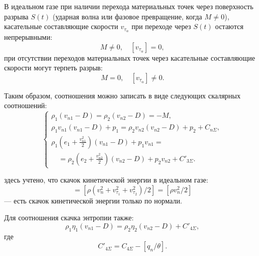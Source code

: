
\begin{theorem}
	В идеальном газе при наличии перехода материальных точек через поверхность разрыва $S(t)$ (ударная волна или фазовое превращение, когда $M \not = 0$), касательные составляющие скорости $v_{\tau_\alpha}$ при переходе через $S(t)$ остаются непрерывными:
	\begin{equation*}
		M \not = 0, \quad [v_{\tau_\alpha}] = 0,
	\end{equation*}
	при отсутствии переходов материальных точек через касательные составляющие скорости могут терпеть разрыв:
	\begin{equation*}
		M = 0, \quad [v_{\tau_\alpha}] \not = 0.
	\end{equation*}
\end{theorem}

Таким образом, соотношения можно записать в виде следующих скалярных соотношений:
\begin{equation}
	\begin{cases}
		\rho_1 \left(v_{n1} - D\right) = \rho_2 \left(v_{n2} - D\right) = -M, \\
		\rho_1 v_{n1} \left(v_{n1} - D\right) + p_1 = \rho_2 v_{n2} \left(v_{n2} - D\right) + p_2 + C_{n\Sigma}, \\
		\rho_1 \left(e_1 + \frac{v_{n1}^2}{2}\right) \left(v_{n1} - D\right) + p_1 v_{n1} = \\
		\quad = \rho_2 \left(e_2 + \frac{v_{n2}^2}{2}\right) \left(v_{n2} - D\right) + p_2 v_{n2} + C'_{3\Sigma}.
	\end{cases} \label{3}
\end{equation}

здесь учтено, что скачок кинетической энергии в идеальном газе:
\begin{equation*}
	[\rho\abs{\mathbf{v}} / 2] = [\rho \left(v^2_n + v^2_{\tau_1} + v^2_{\tau_2}\right) / 2] = [\rho v^2_n / 2]
\end{equation*}
--- есть скачок кинетической энергии только по нормали. 

Для соотношения скачка энтропии также:
\begin{equation*}
	\rho_1 \eta_1 \left(v_{n1} - D\right) = \rho_2 \eta_2 \left(v_{n2} - D\right) + C'_{4\Sigma},
\end{equation*}
где
\begin{equation*}
	C'_{4\Sigma} = C_{4\Sigma} - [q_{n}/\theta].
\end{equation*}


